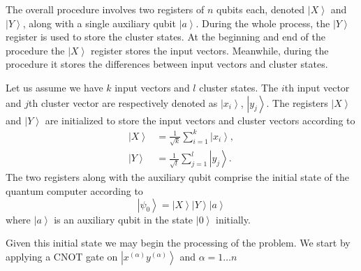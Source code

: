 \documentclass[pra,showkeys,twocolumn,showpacs]{revtex4-1}
\begin{document}
The overall procedure involves two registers of $n$ qubits each, denoted $\left| X \right\rangle$ and $\left| Y \right\rangle$, along with a single auxiliary qubit $\left| a \right\rangle$. 
During the whole process, the $\left| Y \right\rangle$ register is used to store the cluster states.  
At the beginning and end of the procedure the $\left| X \right\rangle$ register stores the input vectors.  
Meanwhile, during the procedure it stores the differences between input vectors and cluster states.

Let us assume we have $k$ input vectors and $l$ cluster states. 
The $i$th input vector and $j$th cluster vector are respectively denoted as $\left| x_i \right\rangle$, $\left| y_j \right\rangle$. 
The registers $\left| X \right\rangle$ and $\left| Y \right\rangle$ are initialized to store the input vectors and cluster vectors according to
%
\begin{align}
    \left| X \right\rangle  & = \frac{1}{\sqrt{k}} \sum\limits_{i=1}^{k} \left| x_i \right\rangle,  \\
    \left| Y \right\rangle&  = \frac{1}{\sqrt{l}} \sum\limits_{j=1}^{l} \left| y_j \right\rangle .
    \label{eq:encodnig}
\end{align}
% 
The two registers along with the auxiliary qubit comprise the initial state of the quantum computer according to
%
\begin{equation} 
\left| \psi_0 \right\rangle = 
    \left| X \right\rangle
    \left| Y \right\rangle 
    \left| a \right\rangle
    \label{eq:initial_state}
\end{equation}
%
where $\left| a \right\rangle$ is an auxiliary qubit in the state $\left| 0 \right\rangle$ initially.

Given this initial state we may begin the processing of the problem. We start by applying a CNOT gate on $\left| x^{(\alpha)} y^{(\alpha)} \right\rangle$ and $\alpha = 1 \dots n$
\end{document}
